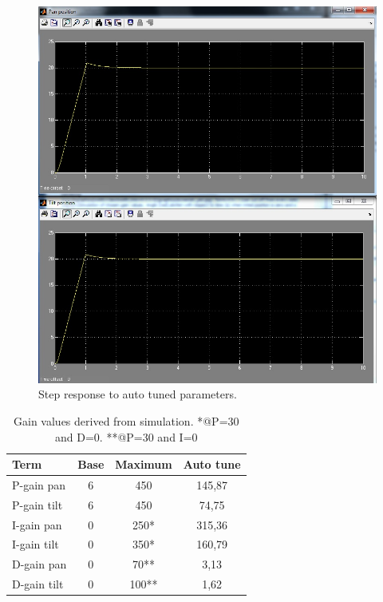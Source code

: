 \begin{figure}[htb]
  \centering
  \includegraphics[width=\textwidth,clip,trim=0 15 0 15]{graphics/screensh_pid.jpg} %
	\caption{Step response to auto tuned parameters.}
	\label{fig:screensh_pid}
\end{figure}


\begin{table}[htb]				
	\centering
	\begin{tabular}{lccc}			
	Term & Base & Maximum & Auto tune \\			
	\midrule												
P-gain pan& 6 & 450 & 145,87\\
P-gain tilt& 6 & 450 & 74,75 \\
I-gain pan& 0 & 250* & 315,36  \\
I-gain tilt& 0 & 350* & 160,79 \\
D-gain pan& 0 & 70** & 3,13 \\
D-gain tilt& 0 & 100** & 1,62\\
	\end{tabular}
	\caption{Gain values derived from simulation. *@P=30 and D=0. **@P=30 and I=0}				
	\label{tab:gain_values}			
\end{table}

